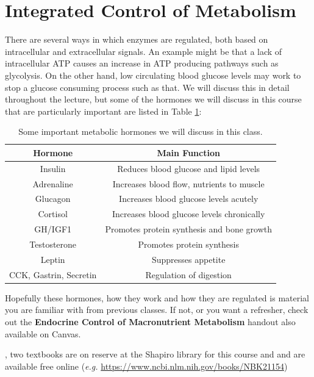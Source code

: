 \documentclass{tufte-handout}
\begin{document}
\section{Integrated Control of Metabolism}

There are several ways in which enzymes are regulated, both based on intracellular and extracellular signals.  An example might be that a lack of intracellular ATP causes an increase in ATP producing pathways such as glycolysis.  On the other hand, low circulating blood glucose levels may work to stop a glucose consuming process such as that.  We will discuss this in detail throughout the lecture, but some of the hormones we will discuss in this course that are particularly important are listed in Table \ref{tab:hormones}:

\begin{table}[h]
\centering
\caption{Some important metabolic hormones we will discuss in this class.}
\label{tab:hormones}
\begin{tabular}{cc}
\hline
\textbf{Hormone}       & \textbf{Main Function}                     \\
\hline
Insulin                & Reduces blood glucose and lipid levels     \\
Adrenaline			   & Increases blood flow, nutrients to muscle \\
Glucagon               & Increases blood glucose levels acutely     \\
Cortisol               & Increases blood glucose levels chronically \\
GH/IGF1                & Promotes protein synthesis and bone growth \\
Testosterone           & Promotes protein synthesis                 \\
Leptin                 & Suppresses appetite                        \\
CCK, Gastrin, Secretin & Regulation of digestion                   \\
\hline
\end{tabular}
\end{table}


Hopefully these hormones, how they work and how they are regulated is material you are familiar with from previous classes.  If not, or you want a refresher, check out the \textbf{Endocrine Control of Macronutrient Metabolism} handout also available on Canvas.  

, two textbooks are on reserve at the Shapiro library for this course \cite{Berg2013} and \cite{Ferrier2017} and are available free online (\textit{e.g.} \url{https://www.ncbi.nlm.nih.gov/books/NBK21154})



\end{document}

